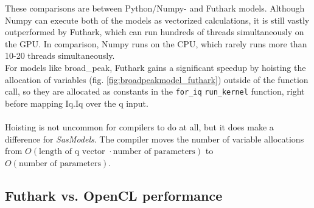\documentclass[11pt]{article}
\newcommand{\sasmodels}{\textit{SasModels}}
\newcommand{\foriq}{\texttt{for\_iq}}
\begin{document}
\begin{mdframed}[
  frametitle={Why does Futhark perform faster than Python?},
  nobreak=true
  ]
These comparisons are between Python/Numpy- and Futhark models.
Although Numpy can execute both of the models as vectorized calculations, 
it is still vastly outperformed by Futhark, which can run hundreds of threads 
simultaneously on the GPU. In comparison, Numpy runs on the CPU, which rarely 
runs more than 10-20 threads simultaneously.
\\
For models like broad\_peak, Futhark gains a significant speedup by 
hoisting\cite[sec 2.3]{pldi17} the allocation of variables 
(fig. \ref{fig:broadpeakmodel_futhark}) outside of
the function call, so they are allocated as constants in the \foriq{} 
\texttt{run\_kernel} function, right before mapping Iq.Iq over the q input.
\\\\
Hoisting is not uncommon for compilers to do at all, but it does make a 
difference for \sasmodels{}.
The compiler moves the number of variable allocations from
$O(\text{length of q vector } \cdot \text{number of parameters})$ to 
$O(\text{number of parameters})$.
\end{mdframed}

\subsection{Futhark vs. OpenCL performance}
\end{document}
